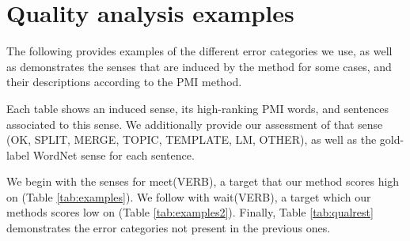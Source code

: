 \documentclass[11pt,a4paper]{article}
\begin{document}

\section{Quality analysis examples} 
\label{app:examples}
The following provides examples of the different error categories we use, as well as demonstrates the senses that are induced by the method for some cases, and their descriptions according to the PMI method.  

Each table shows an induced sense, its high-ranking PMI words, and sentences associated to this sense.
We additionally provide our assessment of that sense (OK, SPLIT, MERGE, TOPIC, TEMPLATE, LM, OTHER), as well as the gold-label WordNet sense for each sentence.

We begin with the senses for meet(VERB), a target that our method scores high on (Table \ref{tab:examples}).  
We follow with wait(VERB), a target which our methods scores low on (Table \ref{tab:examples2}).
Finally, Table \ref{tab:qualrest} demonstrates the error categories not present in the previous ones.  
\end{document}
